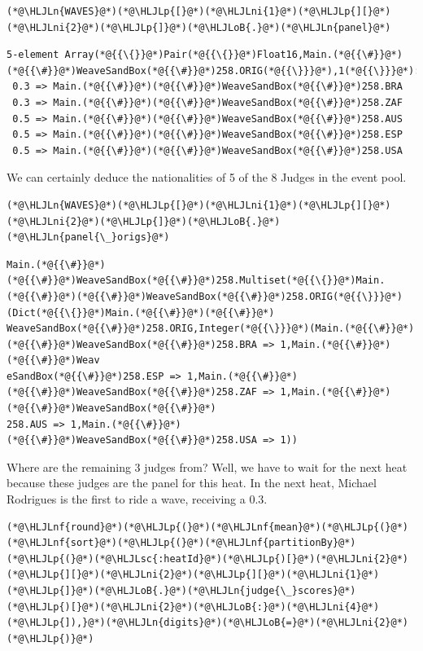 \documentclass[12pt,a4paper]{article}
\newcommand{\HLJLn}[1]{#1}
\newcommand{\HLJLnf}[1]{\textcolor[RGB]{66,102,213}{#1}}
\newcommand{\HLJLsc}[1]{\textcolor[RGB]{201,61,57}{#1}}
\newcommand{\HLJLni}[1]{\textcolor[RGB]{59,151,46}{#1}}
\newcommand{\HLJLoB}[1]{\textcolor[RGB]{102,102,102}{\textbf{#1}}}
\newcommand{\HLJLp}[1]{#1}
\begin{document}
\begin{lstlisting}
(*@\HLJLn{WAVES}@*)(*@\HLJLp{[}@*)(*@\HLJLni{1}@*)(*@\HLJLp{][}@*)(*@\HLJLni{2}@*)(*@\HLJLp{]}@*)(*@\HLJLoB{.}@*)(*@\HLJLn{panel}@*)
\end{lstlisting}

\begin{lstlisting}
5-element Array(*@{{\{}}@*)Pair(*@{{\{}}@*)Float16,Main.(*@{{\#}}@*)(*@{{\#}}@*)WeaveSandBox(*@{{\#}}@*)258.ORIG(*@{{\}}}@*),1(*@{{\}}}@*):
 0.3 => Main.(*@{{\#}}@*)(*@{{\#}}@*)WeaveSandBox(*@{{\#}}@*)258.BRA
 0.3 => Main.(*@{{\#}}@*)(*@{{\#}}@*)WeaveSandBox(*@{{\#}}@*)258.ZAF
 0.5 => Main.(*@{{\#}}@*)(*@{{\#}}@*)WeaveSandBox(*@{{\#}}@*)258.AUS
 0.5 => Main.(*@{{\#}}@*)(*@{{\#}}@*)WeaveSandBox(*@{{\#}}@*)258.ESP
 0.5 => Main.(*@{{\#}}@*)(*@{{\#}}@*)WeaveSandBox(*@{{\#}}@*)258.USA
\end{lstlisting}


We can certainly deduce the nationalities of 5 of the 8 Judges in the event pool.


\begin{lstlisting}
(*@\HLJLn{WAVES}@*)(*@\HLJLp{[}@*)(*@\HLJLni{1}@*)(*@\HLJLp{][}@*)(*@\HLJLni{2}@*)(*@\HLJLp{]}@*)(*@\HLJLoB{.}@*)(*@\HLJLn{panel{\_}origs}@*)
\end{lstlisting}

\begin{lstlisting}
Main.(*@{{\#}}@*)(*@{{\#}}@*)WeaveSandBox(*@{{\#}}@*)258.Multiset(*@{{\{}}@*)Main.(*@{{\#}}@*)(*@{{\#}}@*)WeaveSandBox(*@{{\#}}@*)258.ORIG(*@{{\}}}@*)(Dict(*@{{\{}}@*)Main.(*@{{\#}}@*)(*@{{\#}}@*)
WeaveSandBox(*@{{\#}}@*)258.ORIG,Integer(*@{{\}}}@*)(Main.(*@{{\#}}@*)(*@{{\#}}@*)WeaveSandBox(*@{{\#}}@*)258.BRA => 1,Main.(*@{{\#}}@*)(*@{{\#}}@*)Weav
eSandBox(*@{{\#}}@*)258.ESP => 1,Main.(*@{{\#}}@*)(*@{{\#}}@*)WeaveSandBox(*@{{\#}}@*)258.ZAF => 1,Main.(*@{{\#}}@*)(*@{{\#}}@*)WeaveSandBox(*@{{\#}}@*)
258.AUS => 1,Main.(*@{{\#}}@*)(*@{{\#}}@*)WeaveSandBox(*@{{\#}}@*)258.USA => 1))
\end{lstlisting}


Where are the remaining 3 judges from? Well, we have to wait for the next heat because these judges are the panel for this heat. In the next heat, Michael Rodrigues is the first to ride a wave, receiving a 0.3.


\begin{lstlisting}
(*@\HLJLnf{round}@*)(*@\HLJLp{(}@*)(*@\HLJLnf{mean}@*)(*@\HLJLp{(}@*)(*@\HLJLnf{sort}@*)(*@\HLJLp{(}@*)(*@\HLJLnf{partitionBy}@*)(*@\HLJLp{(}@*)(*@\HLJLsc{:heatId}@*)(*@\HLJLp{)[}@*)(*@\HLJLni{2}@*)(*@\HLJLp{][}@*)(*@\HLJLni{2}@*)(*@\HLJLp{][}@*)(*@\HLJLni{1}@*)(*@\HLJLp{]}@*)(*@\HLJLoB{.}@*)(*@\HLJLn{judge{\_}scores}@*)(*@\HLJLp{)[}@*)(*@\HLJLni{2}@*)(*@\HLJLoB{:}@*)(*@\HLJLni{4}@*)(*@\HLJLp{]),}@*)(*@\HLJLn{digits}@*)(*@\HLJLoB{=}@*)(*@\HLJLni{2}@*)(*@\HLJLp{)}@*)
\end{lstlisting}
\end{document}
